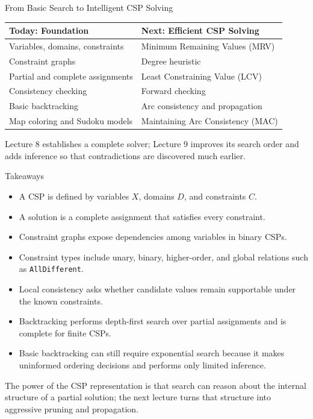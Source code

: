 \documentclass[aspectratio=169,10pt]{beamer}
\begin{document}
\begin{frame}[shrink=20]{From Basic Search to Intelligent CSP Solving}
  \begin{center}
  \renewcommand{\arraystretch}{1.35}
  \begin{tabular}{l|l}
    \textbf{Today: Foundation} & \textbf{Next: Efficient CSP Solving} \\\hline
    Variables, domains, constraints & Minimum Remaining Values (MRV) \\
    Constraint graphs & Degree heuristic \\
    Partial and complete assignments & Least Constraining Value (LCV) \\
    Consistency checking & Forward checking \\
    Basic backtracking & Arc consistency and propagation \\
    Map coloring and Sudoku models & Maintaining Arc Consistency (MAC)
  \end{tabular}
  \end{center}

  \begin{keyidea}
    Lecture 8 establishes a complete solver; Lecture 9 improves its search order and adds inference so that contradictions are discovered much earlier.
  \end{keyidea}
\end{frame}

\begin{frame}[shrink=20]{Takeaways}
  \begin{itemize}
    \item A CSP is defined by variables $X$, domains $D$, and constraints $C$.
    \item A solution is a complete assignment that satisfies every constraint.
    \item Constraint graphs expose dependencies among variables in binary CSPs.
    \item Constraint types include unary, binary, higher-order, and global relations such as \texttt{AllDifferent}.
    \item Local consistency asks whether candidate values remain supportable under the known constraints.
    \item Backtracking performs depth-first search over partial assignments and is complete for finite CSPs.
    \item Basic backtracking can still require exponential search because it makes uninformed ordering decisions and performs only limited inference.
  \end{itemize}

  \begin{keyidea}
    The power of the CSP representation is that search can reason about the internal structure of a partial solution; the next lecture turns that structure into aggressive pruning and propagation.
  \end{keyidea}
\end{frame}
\end{document}
